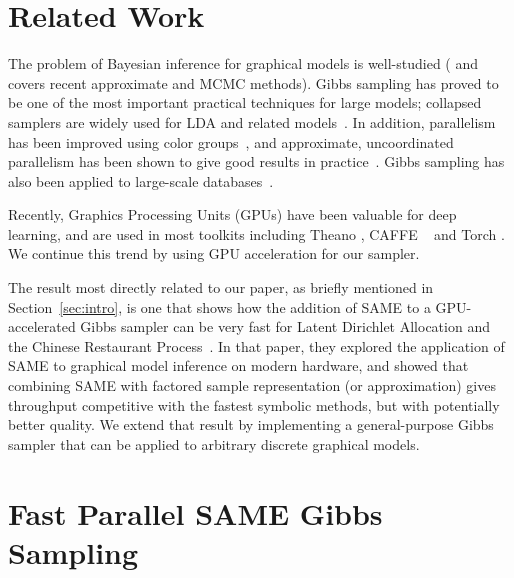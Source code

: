 \documentclass{article} %
\begin{document}
\section{Related Work}\label{sec:related_work}

The problem of Bayesian inference for graphical models is  well-studied (\citet{Koller2009}
and~\citet{Wainwright2008} covers recent approximate and MCMC methods). Gibbs sampling has proved to
be one of the most important practical techniques for large models; collapsed samplers are widely
used for LDA and related models~\citep{Griffiths_Steyvers}. In addition, parallelism has been
improved using color groups~\citep{Gonzalez2011}, and approximate, uncoordinated parallelism has
been shown to give good results in practice~\citep{Johnson2013}.  Gibbs sampling has also been
applied to large-scale databases~\citep{Zhang2013}.

Recently, Graphics Processing Units (GPUs) have been valuable for deep learning, and are used in
most toolkits including Theano \citep{Theano2012}, CAFFE ~\citep{jia2014caffe} and Torch
\citep{Torch}. We continue this trend by using GPU acceleration for our sampler.

The result most directly related to our paper, as briefly mentioned in Section~\ref{sec:intro}, is
one that shows how the addition of SAME to a GPU-accelerated Gibbs sampler can be very fast for
Latent Dirichlet Allocation and the Chinese Restaurant Process~\citep{SAME2015}. In that paper, they
explored the application of SAME to graphical model inference on modern hardware, and showed that
combining SAME with factored sample representation (or approximation) gives throughput competitive
with the fastest symbolic methods, but with potentially better quality. We extend that result by
implementing a general-purpose Gibbs sampler that can be applied to arbitrary discrete graphical
models.





\section{Fast Parallel SAME Gibbs Sampling}\label{sec:same}
\end{document}
